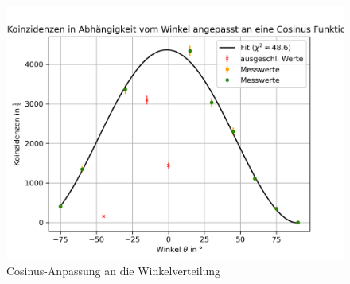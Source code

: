 \documentclass{article}
\begin{document}
\begin{figure}[H]
    \centering
    \includegraphics[width=1\textwidth]{figures/cosAnpassung.png}
    \caption{Cosinus-Anpassung an die Winkelverteilung}
    \label{fig:WinkelverteilungCosinus}
\end{figure}
\end{document}
